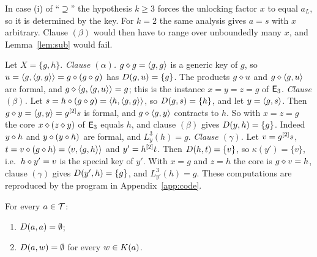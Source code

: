 \begin{remark}
In case (i) of ``$\supseteq$'' the hypothesis $k\ge3$ forces the unlocking
factor $x$ to equal $a_L$, so it is determined by the key. For $k=2$ the same
analysis gives $a=s$ with $x$ arbitrary. Clause $(\beta)$ would then have to
range over unboundedly many $x$, and Lemma~\ref{lem:sub} would fail.
\end{remark}

\begin{example}[The three clauses at work; $k=3$, $\theta=\lambda$]\label{ex:clauses}
Let $X=\{g,h\}$.
\emph{Clause $(\alpha)$.} $g\mathbin{\diamond} g=\langle g,g\rangle$ is a generic key of $g$, so
$u=\langle g,\langle g,g\rangle\rangle=g\mathbin{\diamond}(g\mathbin{\diamond} g)$ has $D(g,u)=\{g\}$. The products $g\mathbin{\diamond} u$
and $g\mathbin{\diamond}\langle g,u\rangle$ are formal, and $g\mathbin{\diamond}\langle g,\langle g,u\rangle\rangle=g$; this is the
instance $x=y=z=g$ of $\mathsf{E}_{3}$.
\emph{Clause $(\beta)$.} Let $s=h\mathbin{\diamond}(g\mathbin{\diamond} g)=\langle h,\langle g,g\rangle\rangle$, so
$D(g,s)=\{h\}$, and let $y=\langle g,s\rangle$. Then $g\mathbin{\diamond} y=\langle g,y\rangle=g^{[2]}s$
is formal, and $g\mathbin{\diamond}\langle g,y\rangle$ contracts to $h$. So with $x=z=g$ the core
$x\mathbin{\diamond}(z\mathbin{\diamond} y)$ of $\mathsf{E}_{3}$ equals $h$, and clause $(\beta)$ gives
$D(y,h)=\{g\}$. Indeed $y\mathbin{\diamond} h$ and $y\mathbin{\diamond}(y\mathbin{\diamond} h)$ are formal, and
$L_y^3(h)=g$.
\emph{Clause $(\gamma)$.} Let $v=g^{[2]}s$, $t=v\mathbin{\diamond}(g\mathbin{\diamond} h)=\langle v,\langle g,h\rangle\rangle$
and $y'=h^{[2]}t$. Then $D(h,t)=\{v\}$, so $\kappa(y')=\{v\}$, i.e.\
$h\mathbin{\diamond} y'=v$ is the special key of $y'$. With $x=g$ and $z=h$ the core is
$g\mathbin{\diamond} v=h$, clause $(\gamma)$ gives $D(y',h)=\{g\}$, and $L_{y'}^3(h)=g$.
These computations are reproduced by the program in Appendix~\ref{app:code}.
\end{example}

\begin{lemma}[Vacuity]\label{lem:vacuity}
For every $a\in\mathcal{T}$:
\begin{enumerate}[label=\textup{(\alph*)}]
\item $D(a,a)=\emptyset$;
\item $D(a,w)=\emptyset$ for every $w\in K(a)$.
\end{enumerate}
\end{lemma}

